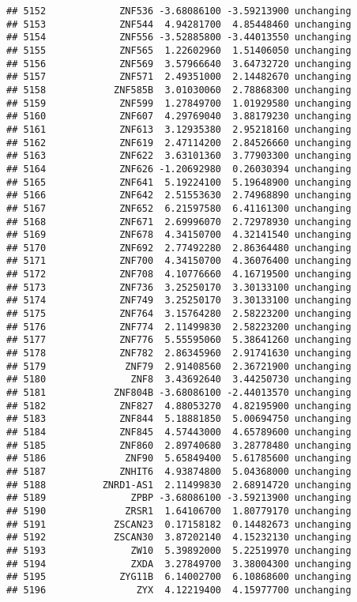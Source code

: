 \documentclass[]{article}
\begin{document}
\begin{verbatim}
## 5152             ZNF536 -3.68086100 -3.59213900 unchanging
## 5153             ZNF544  4.94281700  4.85448460 unchanging
## 5154             ZNF556 -3.52885800 -3.44013550 unchanging
## 5155             ZNF565  1.22602960  1.51406050 unchanging
## 5156             ZNF569  3.57966640  3.64732720 unchanging
## 5157             ZNF571  2.49351000  2.14482670 unchanging
## 5158            ZNF585B  3.01030060  2.78868300 unchanging
## 5159             ZNF599  1.27849700  1.01929580 unchanging
## 5160             ZNF607  4.29769040  3.88179230 unchanging
## 5161             ZNF613  3.12935380  2.95218160 unchanging
## 5162             ZNF619  2.47114200  2.84526660 unchanging
## 5163             ZNF622  3.63101360  3.77903300 unchanging
## 5164             ZNF626 -1.20692980  0.26030394 unchanging
## 5165             ZNF641  5.19224100  5.19648900 unchanging
## 5166             ZNF642  2.51553630  2.74968890 unchanging
## 5167             ZNF652  6.21597580  6.41161300 unchanging
## 5168             ZNF671  2.69996070  2.72978930 unchanging
## 5169             ZNF678  4.34150700  4.32141540 unchanging
## 5170             ZNF692  2.77492280  2.86364480 unchanging
## 5171             ZNF700  4.34150700  4.36076400 unchanging
## 5172             ZNF708  4.10776660  4.16719500 unchanging
## 5173             ZNF736  3.25250170  3.30133100 unchanging
## 5174             ZNF749  3.25250170  3.30133100 unchanging
## 5175             ZNF764  3.15764280  2.58223200 unchanging
## 5176             ZNF774  2.11499830  2.58223200 unchanging
## 5177             ZNF776  5.55595060  5.38641260 unchanging
## 5178             ZNF782  2.86345960  2.91741630 unchanging
## 5179              ZNF79  2.91408560  2.36721900 unchanging
## 5180               ZNF8  3.43692640  3.44250730 unchanging
## 5181            ZNF804B -3.68086100 -2.44013570 unchanging
## 5182             ZNF827  4.88053270  4.82195900 unchanging
## 5183             ZNF844  5.18881850  5.00694750 unchanging
## 5184             ZNF845  4.57443000  4.65789600 unchanging
## 5185             ZNF860  2.89740680  3.28778480 unchanging
## 5186              ZNF90  5.65849400  5.61785600 unchanging
## 5187             ZNHIT6  4.93874800  5.04368000 unchanging
## 5188          ZNRD1-AS1  2.11499830  2.68914720 unchanging
## 5189               ZPBP -3.68086100 -3.59213900 unchanging
## 5190              ZRSR1  1.64106700  1.80779170 unchanging
## 5191            ZSCAN23  0.17158182  0.14482673 unchanging
## 5192            ZSCAN30  3.87202140  4.15232130 unchanging
## 5193               ZW10  5.39892000  5.22519970 unchanging
## 5194               ZXDA  3.27849700  3.38004300 unchanging
## 5195             ZYG11B  6.14002700  6.10868600 unchanging
## 5196                ZYX  4.12219400  4.15977700 unchanging
\end{verbatim}
\end{document}
